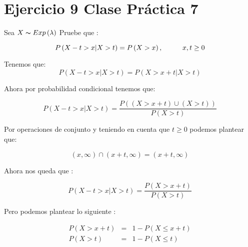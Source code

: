\documentclass{article}
\begin{document}
    \section*{Ejercicio 9 Clase Pr\'actica 7} 

    \begin{flushleft}
            
        Sea $ X   \thicksim Exp \left(\lambda\right) $  Pruebe que : 

        \begin{equation*}
            P \left(X-t > x \vert  X > t\right) = P \left(X>x\right),  \hspace*{1.0cm}  x , t \ge 0 
        \end{equation*}

        Tenemos que:
        \begin{equation*}
            P \left(X-t > x \vert  X > t\right) =  P \left(X > x + t\vert  X > t\right)
        \end{equation*}
        
        Ahora por probabilidad condicional tenemos que:

        \begin{equation*}
            P \left(X-t > x \vert  X > t\right) =  \frac{P \left(\left(X>x +t \right) \cup \left(X > t \right)  \right)}{ P \left(X>t\right)}
        \end{equation*}

        Por operaciones de conjunto y teniendo en cuenta que $t \ge 0 $ podemos plantear que:

        \begin{equation*}
            \left(x , \infty \right) \cap \left(x+t , \infty \right)  = \left(x+t , \infty \right)
        \end{equation*} 

        Ahora nos queda que :

        \begin{equation*}
            P \left(X-t > x \vert  X > t\right) =  \frac{P \left(X > x +t \right)}{ P \left(X>t\right)}
        \end{equation*}

        Pero podemos plantear lo siguiente : 

        \begin{equation*}
            \begin{array}{rcl}
                P \left(X > x +t \right)  &  =  &  1 - P \left( X \le x+t \right)
                \\
                P \left(X > t \right)     &  =  &  1 - P \left( X \le t \right)
            \end{array} 
        \end{equation*}


\end{flushleft}
\end{document}
